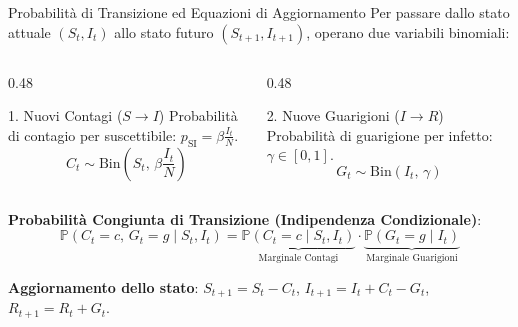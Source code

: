 \documentclass[10pt, aspectratio=169]{beamer}
\begin{document}
\begin{frame}{Probabilità di Transizione ed Equazioni di Aggiornamento}
    Per passare dallo stato attuale $(S_t, I_t)$ allo stato futuro $(S_{t+1}, I_{t+1})$, operano due variabili binomiali:

    \begin{columns}[T]
        \begin{column}{0.48\textwidth}
            \begin{block}{1. Nuovi Contagi ($S \to I$)}
                Probabilità di contagio per suscettibile: $p_{\mathrm{SI}} = \beta \frac{I_t}{N}$.
                \[ C_t \sim \text{Bin}\left(S_t,\, \beta \frac{I_t}{N}\right) \]
            \end{block}
        \end{column}
        \begin{column}{0.48\textwidth}
            \begin{block}{2. Nuove Guarigioni ($I \to R$)}
                Probabilità di guarigione per infetto: $\gamma \in [0,1]$.
                \[ G_t \sim \text{Bin}(I_t,\, \gamma) \]
            \end{block}
        \end{column}
    \end{columns}

    \vspace{0.15cm}
    \textbf{Probabilità Congiunta di Transizione (Indipendenza Condizionale)}:
    \footnotesize
    \[
    \mathbb{P}(C_t = c, \, G_t = g \mid S_t, I_t) = \underbrace{\mathbb{P}(C_t = c \mid S_t, I_t)}_{\text{Marginale Contagi}} \cdot \underbrace{\mathbb{P}(G_t = g \mid I_t)}_{\text{Marginale Guarigioni}}
    \]
    \normalsize

    \textbf{Aggiornamento dello stato}: $S_{t+1} = S_t - C_t$, \quad $I_{t+1} = I_t + C_t - G_t$, \quad $R_{t+1} = R_t + G_t$.

\end{frame}
\end{document}
